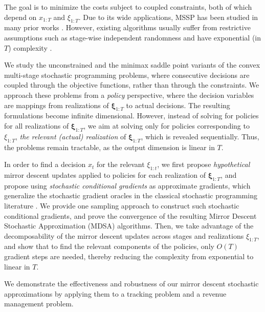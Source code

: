 \documentclass[11pt,fullpage,letterpaper]{article}
\newcommand{\bx}{\boldsymbol{\xi}}
\begin{document}
The goal is to minimize the costs subject to coupled constraints, both of which depend on $x_{1:T}$ and $\xi_{1:T}$. Due to its wide applications, MSSP has been studied in many prior works \cite{SDDP-review,pereira_multi-stage_1991,Shapiro2021Lectures}. However, existing algorithms usually suffer from restrictive assumptions such as stage-wise independent randomness \cite{SDDP-review,LanShapiro2024} and have exponential (in $T$) complexity \cite{lan_dynamic_2021,SHAPIRO20061complexity}. 




We study the unconstrained and the minimax saddle point variants of the convex multi-stage stochastic programming problems, where consecutive decisions are coupled through the objective functions, rather than through the constraints. We approach these problems from a \textit{policy} perspective, where the decision variables are mappings from realizations of $\bx_{1:T}$ to actual decisions. The resulting formulations become infinite dimensional. However, instead of solving for policies for all realizations of $\bx_{1:T}$, we aim at solving only for policies corresponding to $\xi_{1:T}$, \textit{the relevant (actual) realization} of $\bx_{1:T}$, which is revealed sequentially. Thus, the problems remain tractable, as the output dimension is linear in $T$. 

In order to find a decision $x_t$ for the relevant $\xi_{1:t}$, we first propose \textit{hypothetical} mirror descent updates applied to policies for each realization of $\bx_{1:T}$, and propose using \textit{stochastic conditional gradients} as approximate gradients, which generalize the stochastic gradient oracles in the classical stochastic programming literature \cite{LanBook,NemirovskiRobustSA2009}. We provide one sampling approach to construct such stochastic conditional gradients, and prove the convergence of the resulting Mirror Descent Stochastic Approximation (MDSA) algorithms. Then, we take advantage of the decomposability of the mirror descent updates across stages and realizations $\xi_{1:T}$, and show that to find the relevant components of the policies, only $O(T)$ gradient steps are needed, thereby reducing the complexity from exponential to linear in $T$. 


We demonstrate the effectiveness and robustness of our mirror descent stochastic approximations by applying them to a tracking problem and a revenue management problem. 
\end{document}
